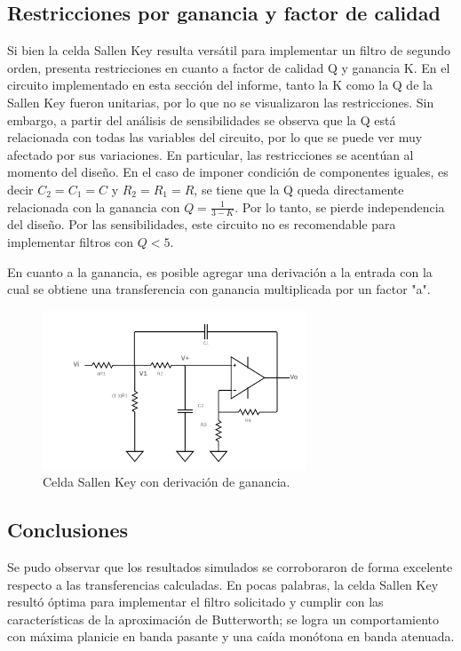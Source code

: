 \subsection{Restricciones por ganancia y factor de calidad}

Si bien la celda Sallen Key resulta versátil para implementar un filtro de segundo orden, presenta restricciones en cuanto a factor de calidad Q y ganancia K. En el circuito implementado en esta sección del informe, tanto la K como la Q de la Sallen Key fueron unitarias, por lo que no se visualizaron las restricciones. Sin embargo, a partir del análisis de sensibilidades se observa que la Q está relacionada con todas las variables del circuito, por lo que se puede ver muy afectado por sus variaciones. En particular, las restricciones se acentúan al momento del diseño. En el caso de imponer condición de componentes iguales, es decir $C_{2} = C_{1} = C$ y $R_{2} = R_{1} = R$, se tiene que la Q queda directamente relacionada con la ganancia con $Q = \frac{1}{3-K}$. Por lo tanto, se pierde independencia del diseño. Por las sensibilidades, este circuito no es recomendable para implementar filtros con $Q<5$. 

En cuanto a la ganancia, es posible agregar una derivación a la entrada con la cual se obtiene una transferencia con ganancia multiplicada por un factor "a".

\begin{figure}[H]
    \centering
        \includegraphics[width= 0.7\textwidth]{../Ejercicio2-DisenoDeCeldas/1CeldaSallenKey/images/SallenKeyGain.png}
    \caption{Celda Sallen Key con derivación de ganancia.}
    \label{fig:SKGain}
\end{figure}


\subsection{Conclusiones}

Se pudo observar que los resultados simulados se corroboraron de forma excelente respecto a las transferencias calculadas. En pocas palabras, la celda Sallen Key resultó óptima para implementar el filtro solicitado y cumplir con las características de la aproximación de Butterworth; se logra un comportamiento con máxima planicie en banda pasante y una caída monótona en banda atenuada. 

